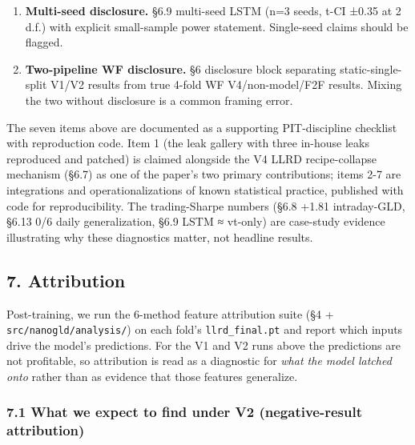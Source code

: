 \documentclass[
]{article}
\begin{document}
\begin{enumerate}
  (daily) and §6.13b (intraday within-frequency) above. Single-asset
  Sharpe claims should be tested across ≥3 asset classes before
  shipping, with a \textbf{family-wise error rate correction respecting
  cross-asset return correlation}. We use Cheverud-Patnaik
  effective-n\_tests inside a Šidák framework (analytically tractable;
  does not require running a permutation test). Our own §6.13b shows the
  3-of-9 uncorrected-p\textless0.10 count collapses to 0-of-9 under FWE,
  which is the discipline that should be applied to all multi-asset
  replication claims.
\item
  \textbf{Multi-seed disclosure.} §6.9 multi-seed LSTM (n=3 seeds, t-CI
  ±0.35 at 2 d.f.) with explicit small-sample power statement.
  Single-seed claims should be flagged.
\item
  \textbf{Two-pipeline WF disclosure.} §6 disclosure block separating
  static-single-split V1/V2 results from true 4-fold WF V4/non-model/F2F
  results. Mixing the two without disclosure is a common framing error.
\end{enumerate}

The seven items above are documented as a supporting PIT-discipline
checklist with reproduction code. Item 1 (the leak gallery with three
in-house leaks reproduced and patched) is claimed alongside the V4 LLRD
recipe-collapse mechanism (§6.7) as one of the paper's two primary
contributions; items 2-7 are integrations and operationalizations of
known statistical practice, published with code for reproducibility. The
trading-Sharpe numbers (§6.8 +1.81 intraday-GLD, §6.13 0/6 daily
generalization, §6.9 LSTM ≈ vt-only) are case-study evidence
illustrating why these diagnostics matter, not headline results.

\subsection{7. Attribution}\label{attribution}

Post-training, we run the 6-method feature attribution suite (§4 +
\texttt{src/nanogld/analysis/}) on each fold's \texttt{llrd\_final.pt}
and report which inputs drive the model's predictions. For the V1 and V2
runs above the predictions are not profitable, so attribution is read as
a diagnostic for \emph{what the model latched onto} rather than as
evidence that those features generalize.

\subsubsection{7.1 What we expect to find under V2 (negative-result
attribution)}\label{what-we-expect-to-find-under-v2-negative-result-attribution}
\end{document}
